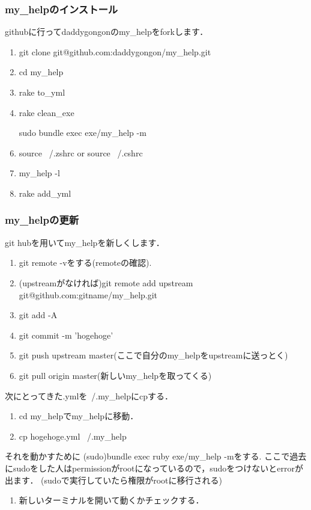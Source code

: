 \subsubsection{my\_helpのインストール}
githubに行ってdaddygongonのmy\_helpをforkします．

\begin{enumerate}
\item git clone git@github.com:daddygongon/my\_help.git
\item cd my\_help
\item rake to\_yml
\item rake clean\_exe
\item [sudo] bundle exec exe/my\_help -m
\item source ~/.zshrc or source ~/.cshrc
\item my\_help -l
\item rake add\_yml
\end{enumerate}
\subsubsection{my\_helpの更新}
git hubを用いてmy\_helpを新しくします．

\begin{enumerate}
\item git remote -vをする(remoteの確認).
\item (upstreamがなければ)git remote add upstream git@github.com:gitname/my\_help.git
\item git add -A
\item git commit -m 'hogehoge'
\item git push upstream master(ここで自分のmy\_helpをupstreamに送っとく)
\item git pull origin master(新しいmy\_helpを取ってくる)
\end{enumerate}
次にとってきた.ymlを~/.my\_helpにcpする．

\begin{enumerate}
\item cd my\_helpでmy\_helpに移動．
\item cp hogehoge.yml ~/.my\_help
\end{enumerate}
それを動かすために
(sudo)bundle exec ruby exe/my\_help -mをする.
ここで過去にsudoをした人はpermissionがrootになっているので，sudoをつけないとerrorが出ます．
(sudoで実行していたら権限がrootに移行される)

\begin{enumerate}
\item 新しいターミナルを開いて動くかチェックする．
\end{enumerate}
